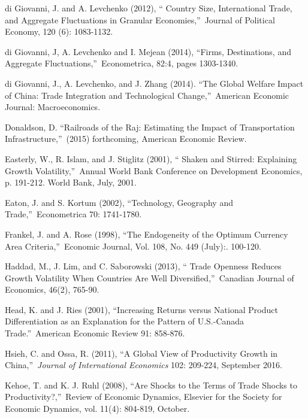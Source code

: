 \documentclass[12pt]{article}
\begin{document}
\begin{thebibliography}{99}
\bibitem{} di Giovanni, J. and A. Levchenko (2012), \textquotedblleft
Country Size, International Trade, and Aggregate Fluctuations in Granular
Economies,\textquotedblright\ Journal of Political Economy, 120 (6):
1083-1132.

\bibitem{} di Giovanni, J, A. Levchenko and I. Mejean (2014),
\textquotedblleft Firms, Destinations, and Aggregate
Fluctuations,\textquotedblright\ Econometrica, 82:4, pages 1303-1340.

\bibitem{} di Giovanni, J., A. Levchenko, and J. Zhang (2014).
\textquotedblleft The Global Welfare Impact of China: Trade Integration and
Technological Change,\textquotedblright\ American Economic Journal:
Macroeconomics.

\bibitem{} Donaldson, D. \textquotedblleft Railroads of the Raj: Estimating
the Impact of Transportation Infrastructure,\textquotedblright\ (2015)
forthcoming, American Economic Review.

\bibitem{} Easterly, W., R. Islam, and J. Stiglitz (2001), \textquotedblleft
Shaken and Stirred: Explaining Growth Volatility,\textquotedblright\ Annual
World Bank Conference on Development Economics, p. 191-212. World Bank,
July, 2001.

\bibitem{} Eaton, J. and S. Kortum (2002), \textquotedblleft Technology,
Geography and Trade,\textquotedblright\ Econometrica 70: 1741-1780.

\bibitem{} Frankel, J. and A. Rose (1998), \textquotedblleft The Endogeneity
of the Optimum Currency Area Criteria,\textquotedblright\ Economic Journal,
Vol. 108, No. 449 (July):. 100-120.

\bibitem{} Haddad, M., J. Lim, and C. Saborowski (2013), \textquotedblleft
Trade Openness Reduces Growth Volatility When Countries Are Well
Diversified,\textquotedblright\ Canadian Journal of Economics, 46(2), 765-90.

\bibitem{} Head, K. and J. Ries (2001), \textquotedblleft Increasing Returns
versus National Product Differentiation as an Explanation for the Pattern of
U.S.-Canada Trade.\textquotedblright\ American Economic Review 91: 858-876.

\bibitem{} Hsieh, C. and Ossa, R. (2011), \textquotedblleft A Global View of
Productivity Growth in China,\textquotedblright\ \textit{Journal of
International Economics} 102: 209-224, September 2016.

\bibitem{} Kehoe, T. and K. J. Ruhl (2008), \textquotedblleft Are Shocks to
the Terms of Trade Shocks to Productivity?,\textquotedblright\ Review of
Economic Dynamics, Elsevier for the Society for Economic Dynamics, vol.
11(4): 804-819, October.


\end{thebibliography}
\end{document}

